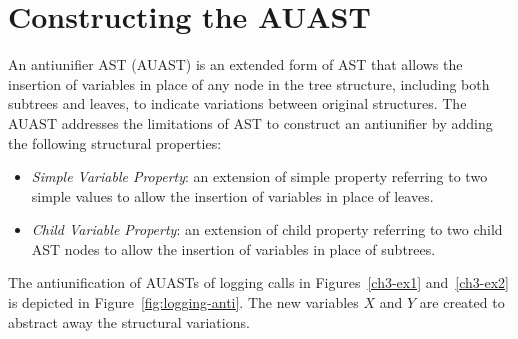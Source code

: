 \section{Constructing the AUAST} \label{AUAST}
An antiunifier AST (AUAST) is an extended form of AST that allows the insertion of variables in place of any node in the tree structure, including both subtrees and leaves, to indicate variations between original structures. The AUAST addresses the limitations of AST to construct an antiunifier by adding the following structural properties:
\begin{itemize} [leftmargin=.4in]
\item \textit{Simple Variable Property}: an extension of simple property referring to two simple values to allow the insertion of variables in place of leaves.
\end{itemize}
\begin{itemize} [leftmargin=.4in]
\item \textit{Child Variable Property}: an extension of child property referring to two child AST nodes to allow the insertion of variables in place of subtrees.
\end{itemize}
The antiunification of AUASTs of logging calls in Figures~\ref{ch3-ex1} and~\ref{ch3-ex2} is depicted in Figure~\ref{fig:logging-anti}. The new variables $X$ and $Y$ are created to abstract away the structural variations.


